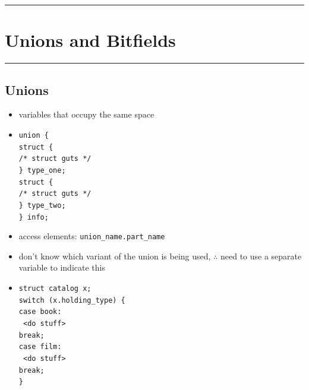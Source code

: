 \documentclass[10pt, multicolumn, a4paper]{article}
\begin{document}

\hrule
\section{Unions and Bitfields}
\hrule 

\begin{multicols}{2}
	\subsection*{Unions}
	\begin{itemize}
	\item variables that occupy the same space
	\item \verb|union {| 
		\\ \hspace*{5mm} \verb|struct {| \\ \hspace*{10mm} \verb|/* struct guts */| \\ \hspace*{5mm} \verb|} type_one;|
		\\ \hspace*{5mm} \verb|struct {| \\ \hspace*{10mm} \verb|/* struct guts */| \\ \hspace*{5mm} \verb|} type_two;|
		\\ \verb|} info;|
	\item access elements: \verb|union_name.part_name|
	\item don't know which variant of the union is being used, $\therefore$ need to use a separate variable to indicate this
	\item \verb|struct catalog x;|
		\\ \verb|switch (x.holding_type) {| 
			\\ \hspace*{5mm} \verb|case book:| \\ \texttt{\hspace*{10mm} <do stuff> \\ \hspace*{10mm} break;}
			\\ \hspace*{5mm} \verb|case film:| \\ \texttt{\hspace*{10mm} <do stuff> \\ \hspace*{10mm} break;}
			\\ \verb|}|
	\end{itemize}
	

\end{multicols}
\end{document}
